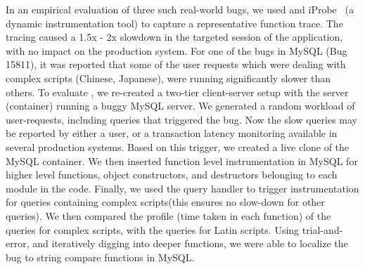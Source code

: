 In an empirical evaluation of three such real-world bugs, we used \parikshan and iProbe~\cite{iProbe} (a dynamic instrumentation tool) to capture a representative function trace.
The tracing caused a 1.5x - 2x slowdown in the targeted session of the application,  with no impact on the production system.
For one of the bugs in  MySQL (Bug 15811), it was reported that some of the user requests which were dealing with complex scripts (Chinese, Japanese), were running significantly slower than others.
To evaluate \parikshan, we re-created a two-tier client-server setup with the server (container) running a buggy MySQL server. 
We generated a random workload of user-requests, including queries that triggered the bug.
Now the slow queries may be reported by either a user, or a transaction latency monitoring available in several production systems. 
Based on this trigger, we created a live clone of the MySQL container. 
We then inserted function level instrumentation in MySQL for higher level functions, object constructors, and destructors belonging to each module in the code.
Finally, we used the query handler to trigger instrumentation for queries containing complex scripts(this ensures no slow-down for other queries).
We then compared the profile (time taken in each function) of the queries for complex scripts, with the queries for Latin scripts.
Using trial-and-error, and iteratively digging into deeper functions, we were able to localize the bug to string compare functions in MySQL.



